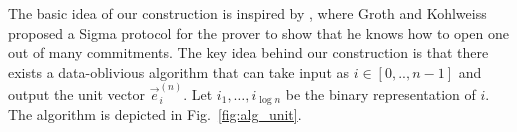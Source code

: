 The basic idea of our construction is inspired by \cite{Groth2015}, where Groth and Kohlweiss proposed a Sigma protocol for the prover to show that he knows how to open one out of many commitments. The key idea behind our construction is that there exists a data-oblivious algorithm that can take input as $i \in [0,..,n-1]$ and output the unit vector $\vec{e}_i^{(n)}$. Let $i_1,\ldots, i_{\log n}$ be the binary representation of $i$. The algorithm is depicted in Fig.~\ref{fig:alg_unit}.



